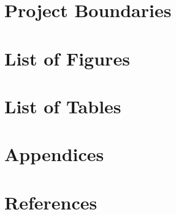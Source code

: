 \documentclass{article}
\begin{document}
\newpage

\section{Project Boundaries}


\newpage

\section{List of Figures}

\section{List of Tables}

\section{Appendices}



\section{References}
\printbibliography
\end{document}
